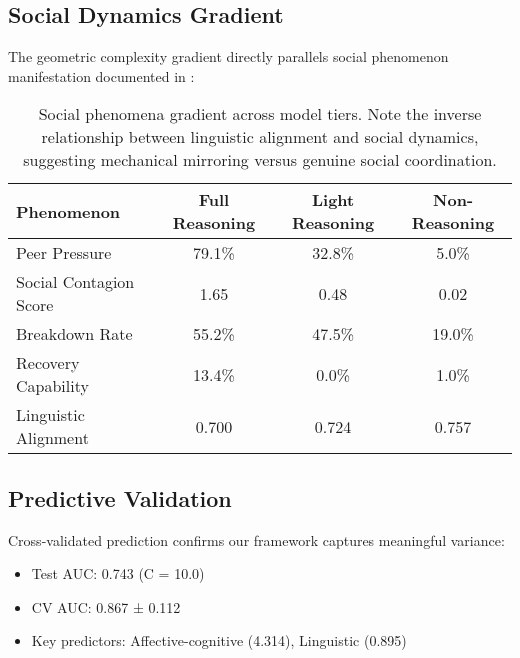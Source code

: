 \documentclass[11pt,letterpaper]{article}
\newcommand{\bestRegularizationC}{10.0}
\newcommand{\cvAUCMean}{0.867}
\newcommand{\cvAUCStd}{0.112}
\newcommand{\testAUC}{0.743}
\newcommand{\linguisticSynchronyCoef}{0.895}
\newcommand{\affectiveCognitiveCoef}{4.314}
\newcommand{\fullReasoningPeerPressure}{79.1\%}
\newcommand{\lightReasoningPeerPressure}{32.8\%}
\newcommand{\nonReasoningPeerPressure}{5.0\%}
\newcommand{\fullReasoningBreakdown}{55.2\%}
\newcommand{\lightReasoningBreakdown}{47.5\%}
\newcommand{\nonReasoningBreakdown}{19.0\%}
\newcommand{\fullReasoningRecovery}{13.4\%}
\newcommand{\lightReasoningRecovery}{0.0\%}
\newcommand{\nonReasoningRecovery}{1.0\%}
\newcommand{\fullLinguisticAlignment}{0.700}
\newcommand{\lightLinguisticAlignment}{0.724}
\newcommand{\nonLinguisticAlignment}{0.757}
\newcommand{\socialContagionFullMean}{1.65}
\newcommand{\socialContagionLightMean}{0.48}
\newcommand{\socialContagionNoMean}{0.02}
\begin{document}
\subsection{Social Dynamics Gradient}

The geometric complexity gradient directly parallels social phenomenon manifestation documented in \citep{garcia2025peer}:

\begin{table}[h]
\centering
\begin{tabular}{lccc}
\toprule
Phenomenon & Full Reasoning & Light Reasoning & Non-Reasoning \\
\midrule
Peer Pressure & \fullReasoningPeerPressure{} & \lightReasoningPeerPressure{} & \nonReasoningPeerPressure{} \\
Social Contagion Score & \socialContagionFullMean{} & \socialContagionLightMean{} & \socialContagionNoMean{} \\
Breakdown Rate & \fullReasoningBreakdown{} & \lightReasoningBreakdown{} & \nonReasoningBreakdown{} \\
Recovery Capability & \fullReasoningRecovery{} & \lightReasoningRecovery{} & \nonReasoningRecovery{} \\
Linguistic Alignment & \fullLinguisticAlignment{} & \lightLinguisticAlignment{} & \nonLinguisticAlignment{} \\
\bottomrule
\end{tabular}
\caption{Social phenomena gradient across model tiers. Note the inverse relationship between linguistic alignment and social dynamics, suggesting mechanical mirroring versus genuine social coordination.}
\label{tab:social_gradient}
\end{table}

\subsection{Predictive Validation}

Cross-validated prediction confirms our framework captures meaningful variance:

\begin{itemize}
    \item Test AUC: \testAUC{} (C = \bestRegularizationC{})
    \item CV AUC: \cvAUCMean{} ± \cvAUCStd{}
    \item Key predictors: Affective-cognitive (\affectiveCognitiveCoef{}), Linguistic (\linguisticSynchronyCoef{})
\end{itemize}
\end{document}
